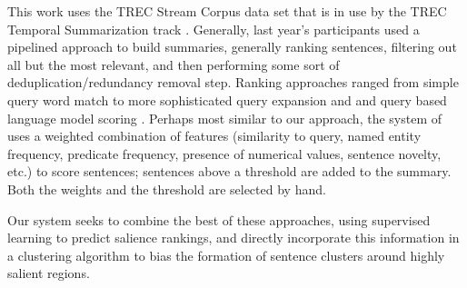 \documentclass{sig-alternate} \usepackage{url} \usepackage{color}
\begin{document}
This work uses the TREC Stream Corpus data set that is in use by the TREC
Temporal Summarization track \cite{frank2012building,aslam2013trec} .
Generally, last year's participants used a pipelined approach to build
summaries, generally ranking sentences, filtering out all but the most
relevant, and then performing some sort of deduplication/redundancy removal
step.  Ranking approaches ranged from simple query word match to more
sophisticated query expansion and and query based language model scoring
\cite{liu2013ictnet,xu2013trec,baruah2013univ}.  Perhaps most similar to our
approach, the system of \cite{xu2013trec} uses a weighted combination of
features (similarity to query, named entity frequency, predicate frequency,
presence of numerical values, sentence novelty, etc.) to score sentences;
sentences above a threshold are added to the summary.  Both the weights and
the threshold are selected by hand.


Our system seeks to combine the best of these approaches, using supervised
learning to predict salience rankings, and directly incorporate this
information in a clustering algorithm to bias the formation of sentence
clusters around highly salient regions. 








 





\end{document}
